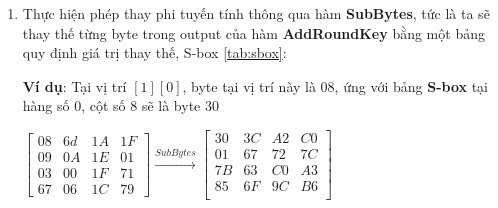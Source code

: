 \begin{enumerate}[label= \textbf{Bước \arabic*:}]
	Tại bước khởi tạo \textbf{AddRoundKey} đầu tiên, ta sẽ khởi tạo bằng cách thực hiện phép \textbf{XOR} giữa \textbf{Plaintext} với \textbf{CypherKey} ban đầu. 
	
	Hàm \textbf{AddRoundKey} ở các vòng tiếp theo, ta sẽ thực hiện phép \textbf{XOR} giữa output các phép biến đổi ở vòng trước kết hợp với khóa phụ \textbf{RoundKey} tương ứng.
	
	\textbf{Ví dụ:} Tại vị trí $[1][0]$,  $44 \oplus 4C = 0100 0100 \oplus 0100 1100 =0000 1000 = 8$
	
	\begin{align*}
		\text{AddRoundKey} &= \text{StateMatrix} \oplus \text{CypherKey} \\
		\text{AddRoundKey} &= 
		\begin{bmatrix}
			44 & 48 & 54 & 50 \\
			4C & 47 & 56 & 48 \\
			32 & 54 & 54 & 43 \\
			44 & 56 & 54 & 4D
		\end{bmatrix}
		\oplus
		\begin{bmatrix}
			4C & 59 & 4E & 4F \\
			45 & 4E & 48 & 49 \\
			48 & 48 & 4B & 32 \\
			55 & 41 & 48 & 34
		\end{bmatrix} \\
		\text{AddRoundKey} &= 
		\begin{bmatrix}
			08 & 6d & 1A & 1F \\
			09 & 0A & 1E & 01 \\
			03 & 00 & 1F & 71 \\
			67 & 06 & 1C & 79
		\end{bmatrix}
	\end{align*}
	
	
	\item Thực hiện phép thay phi tuyến tính thông qua hàm \textbf{SubBytes}, tức là ta sẽ thay thế từng byte trong output của hàm \textbf{AddRoundKey} bằng một bảng quy định giá trị thay thế, S-box \ref{tab:sbox}:
	
	\textbf{Ví dụ}: Tại vị trí $[1][0]$, byte tại vị trí này là ${08}$, ứng với bảng \textbf{S-box} tại hàng số 0, cột số 8 sẽ là byte $30$
	\begin{center}
		$\begin{bmatrix}
			08 & 6d & 1A & 1F \\
			09 & 0A & 1E & 01 \\
			03 & 00 & 1F & 71 \\
			67 & 06 & 1C & 79
		\end{bmatrix}
		\xrightarrow{SubBytes}
		\begin{bmatrix}
			30 & 3C & A2 & C0\\
			01 & 67 & 72 & 7C\\
			7B & 63 & C0 & A3\\
			85 & 6F & 9C & B6 \\
		\end{bmatrix}
		$
	\end{center}
	

\end{enumerate}

